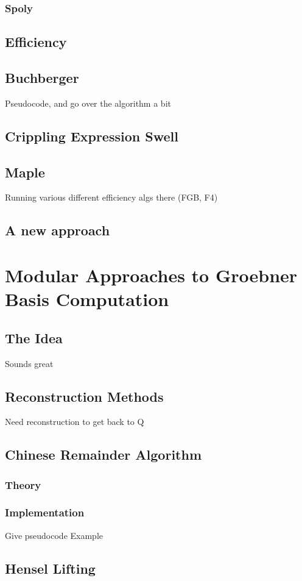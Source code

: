 \documentclass{article}
\begin{document}
\subsubsection{Spoly}
\subsection{Efficiency}
\subsection{Buchberger}
Pseudocode, and go over the algorithm a bit
\subsection{Crippling Expression Swell}
\subsection{Maple}
Running various different efficiency algs there (FGB, F4)
\subsection{A new approach}

\section{Modular Approaches to Groebner Basis Computation}
\subsection{The Idea}
Sounds great
\subsection{Reconstruction Methods}
Need reconstruction to get back to Q
\subsection{Chinese Remainder Algorithm}
\subsubsection{Theory}
\subsubsection{Implementation}
Give pseudocode
Example
\subsection{Hensel Lifting}
\end{document}
